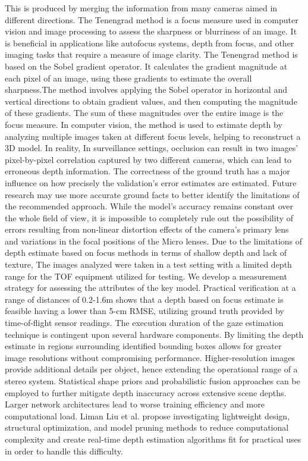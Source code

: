 \documentclass[sn-mathphys]{sn-jnl}%
\theoremstyle{thmstyleone}%
\theoremstyle{thmstyletwo}%
\theoremstyle{thmstylethree}%
\begin{document}
This is produced by merging the information from many cameras aimed in different directions. The Tenengrad method is a focus measure used in computer vision and image processing to assess the sharpness or blurriness of an image. It is beneficial in applications like autofocus systems, depth from focus, and other imaging tasks that require a measure of image clarity. The Tenengrad method is based on the Sobel gradient operator. It calculates the gradient magnitude at each pixel of an image, using these gradients to estimate the overall sharpness.The method involves applying the Sobel operator in horizontal and vertical directions to obtain gradient values, and then computing the magnitude of these gradients. The sum of these magnitudes over the entire image is the focus measure. In computer vision, the method is used to estimate depth by analyzing multiple images taken at different focus levels, helping to reconstruct a 3D model. In reality, In surveillance settings, occlusion can result in two images' pixel-by-pixel correlation captured by two different cameras, which can lead to erroneous depth information. \cite{bib10} The correctness of the ground truth has a major influence on how precisely the validation's error estimates are estimated. Future research may use more accurate ground facts to better identify the limitations of the recommended approach. While the model's accuracy remains constant over the whole field of view, it is impossible to completely rule out the possibility of errors resulting from non-linear distortion effects of the camera's primary lens and variations in the focal positions of the Micro lenses. Due to the limitations of depth estimate based on focus methods in terms of shallow depth and lack of texture, The images analyzed were taken in a test setting with a limited depth range for the TOF equipment utilized for testing. We develop a measurement strategy for assessing the attributes of the key model. Practical verification at a range of distances of 0.2-1.6m shows that a depth based on focus estimate is feasible having a lower than 5-cm RMSE, utilizing ground truth provided by time-of-flight sensor readings. \cite{bib11} The execution duration of the gaze estimation technique is contingent upon several hardware components. \cite {bib15} By limiting the depth estimate in regions surrounding identified bounding boxes allows for greater image resolutions without compromising performance. Higher-resolution images provide additional details per object, hence extending the operational range of a stereo system. Statistical shape priors and probabilistic fusion approaches can be employed to further mitigate depth inaccuracy across extensive scene depths. \cite{bib14} Larger network architectures lead to worse training efficiency and more computational load. Liman Liu et al. \cite{bib16} propose investigating lightweight design, structural optimization, and model pruning methods to reduce computational complexity and create real-time depth estimation algorithms fit for practical uses in order to handle this difficulty. 
\end{document}
